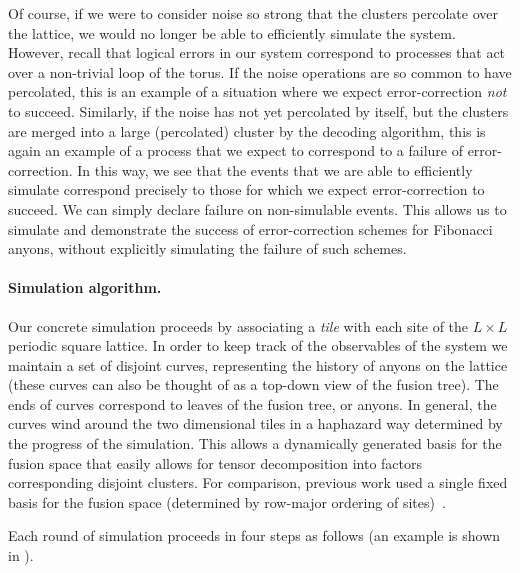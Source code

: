 \documentclass[aps, prl, letterpaper, twocolumn, superscriptaddress, notitlepage, 10pt]{revtex4-1}
\begin{document}
Of course, if we were to consider noise so strong that the clusters percolate over the lattice, we would no longer be able to efficiently simulate the system. However, recall that logical errors in our system correspond to processes that act over a non-trivial loop of the torus. If the noise operations are so common to have percolated, this is an example of a situation where we expect error-correction \emph{not} to succeed. Similarly, if the noise has not yet percolated by itself, but the clusters are merged into a large (percolated) cluster by the decoding algorithm, this is again an example of a process that we expect to correspond to a failure of error-correction. In this way, we see that the events that we are able to efficiently simulate correspond precisely to those for which we expect error-correction to succeed. We can simply declare failure on non-simulable events. This allows us to simulate and demonstrate the success of error-correction schemes for Fibonacci anyons, without explicitly simulating the failure of such schemes.

\paragraph{Simulation algorithm.}

	Our concrete simulation proceeds by associating a \emph{tile} with each site of the $L\times L$ periodic square lattice. In order to keep track of the observables of the system we maintain a set of disjoint curves, representing the history of anyons on the lattice (these curves can also be thought of as a top-down view of the fusion tree). The ends of curves correspond to leaves of the fusion tree, or anyons. In general, the curves wind around the two dimensional tiles in a haphazard way determined by the progress of the simulation. This allows a dynamically generated basis for the fusion space that easily allows for tensor decomposition into factors corresponding disjoint clusters. For comparison, previous work used a single fixed basis for the fusion space (determined by row-major ordering of sites)~\cite{Brell2013}.

Each round of simulation proceeds in four steps as follows (an example is shown in ).
\end{document}
